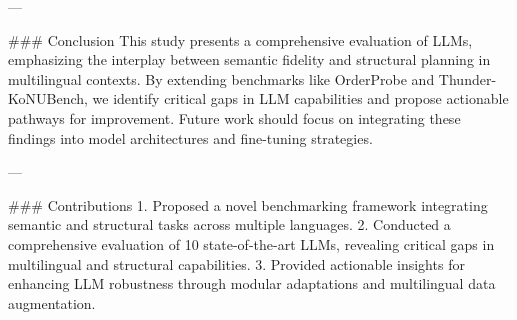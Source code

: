 ---

### Conclusion
This study presents a comprehensive evaluation of LLMs, emphasizing the interplay between semantic fidelity and structural planning in multilingual contexts. By extending benchmarks like OrderProbe and Thunder-KoNUBench, we identify critical gaps in LLM capabilities and propose actionable pathways for improvement. Future work should focus on integrating these findings into model architectures and fine-tuning strategies.

---

### Contributions
1. Proposed a novel benchmarking framework integrating semantic and structural tasks across multiple languages.
2. Conducted a comprehensive evaluation of 10 state-of-the-art LLMs, revealing critical gaps in multilingual and structural capabilities.
3. Provided actionable insights for enhancing LLM robustness through modular adaptations and multilingual data augmentation.